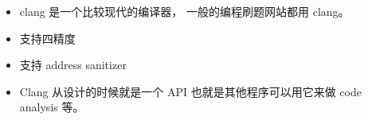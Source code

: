 
\begin{issues}
\issueDraft
\end{issues}

\begin{itemize}
\item clang 是一个比较现代的编译器， 一般的编程刷题网站都用 clang。
\item 支持四精度
\item 支持 address sanitizer
\item Clang 从设计的时候就是一个 API 也就是其他程序可以用它来做 code analysis 等。
\end{itemize}

